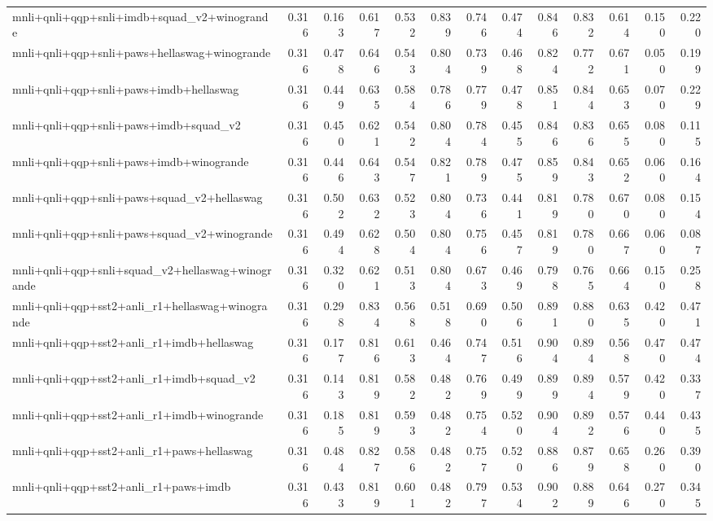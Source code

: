 \begin{table}[t]
\begin{tabular}{lrrrrrrrrrrrr}
    mnli+qnli+qqp+snli+imdb+squad\_v2+winogrande & 0.316 & 0.163 & 0.617 & 0.532 & 0.839 & 0.746 & 0.474 & 0.846 & 0.832 & 0.614 & 0.150 & 0.220 \\
    mnli+qnli+qqp+snli+paws+hellaswag+winogrande & 0.316 & 0.478 & 0.646 & 0.543 & 0.804 & 0.739 & 0.468 & 0.824 & 0.772 & 0.671 & 0.050 & 0.199 \\
    mnli+qnli+qqp+snli+paws+imdb+hellaswag & 0.316 & 0.449 & 0.635 & 0.584 & 0.786 & 0.779 & 0.478 & 0.851 & 0.844 & 0.653 & 0.070 & 0.229 \\
    mnli+qnli+qqp+snli+paws+imdb+squad\_v2 & 0.316 & 0.450 & 0.621 & 0.542 & 0.804 & 0.784 & 0.455 & 0.846 & 0.836 & 0.655 & 0.080 & 0.115 \\
    mnli+qnli+qqp+snli+paws+imdb+winogrande & 0.316 & 0.446 & 0.643 & 0.547 & 0.821 & 0.789 & 0.475 & 0.859 & 0.843 & 0.652 & 0.060 & 0.164 \\
    mnli+qnli+qqp+snli+paws+squad\_v2+hellaswag & 0.316 & 0.502 & 0.632 & 0.523 & 0.804 & 0.736 & 0.441 & 0.819 & 0.780 & 0.670 & 0.080 & 0.154 \\
    mnli+qnli+qqp+snli+paws+squad\_v2+winogrande & 0.316 & 0.494 & 0.628 & 0.504 & 0.804 & 0.756 & 0.457 & 0.819 & 0.780 & 0.667 & 0.060 & 0.087 \\
    mnli+qnli+qqp+snli+squad\_v2+hellaswag+winogrande & 0.316 & 0.320 & 0.621 & 0.513 & 0.804 & 0.673 & 0.469 & 0.798 & 0.765 & 0.664 & 0.150 & 0.258 \\
    mnli+qnli+qqp+sst2+anli\_r1+hellaswag+winogrande & 0.316 & 0.298 & 0.834 & 0.568 & 0.518 & 0.690 & 0.506 & 0.891 & 0.880 & 0.635 & 0.420 & 0.471 \\
    mnli+qnli+qqp+sst2+anli\_r1+imdb+hellaswag & 0.316 & 0.177 & 0.816 & 0.613 & 0.464 & 0.747 & 0.516 & 0.904 & 0.894 & 0.568 & 0.470 & 0.474 \\
    mnli+qnli+qqp+sst2+anli\_r1+imdb+squad\_v2 & 0.316 & 0.143 & 0.819 & 0.582 & 0.482 & 0.769 & 0.499 & 0.899 & 0.894 & 0.579 & 0.420 & 0.337 \\
    mnli+qnli+qqp+sst2+anli\_r1+imdb+winogrande & 0.316 & 0.185 & 0.819 & 0.593 & 0.482 & 0.754 & 0.520 & 0.904 & 0.892 & 0.576 & 0.440 & 0.435 \\
    mnli+qnli+qqp+sst2+anli\_r1+paws+hellaswag & 0.316 & 0.484 & 0.827 & 0.586 & 0.482 & 0.757 & 0.520 & 0.886 & 0.879 & 0.658 & 0.260 & 0.390 \\
    mnli+qnli+qqp+sst2+anli\_r1+paws+imdb & 0.316 & 0.433 & 0.819 & 0.601 & 0.482 & 0.797 & 0.534 & 0.902 & 0.889 & 0.646 & 0.270 & 0.345 \\

\end{tabular}
\end{table}
